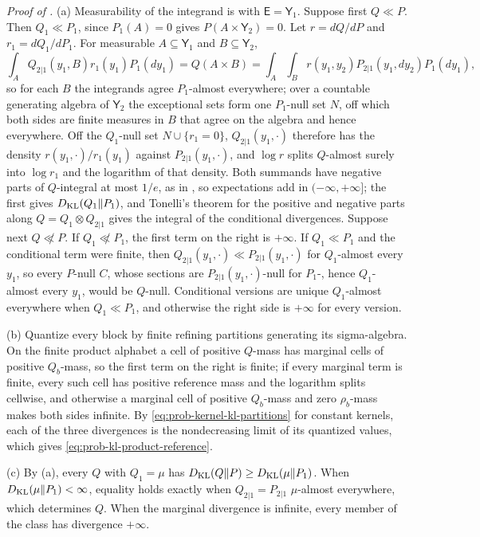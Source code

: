 \noindent\emph{Proof of .}
(a) Measurability of the integrand is  with $\mathsf E=\mathsf Y_1$.
Suppose first $Q\ll P$. Then $Q_1\ll P_1$, since $P_1(A)=0$ gives $P(A\times\mathsf Y_2)=0$. Let $r=dQ/dP$ and
$r_1=dQ_1/dP_1$. For measurable $A\subseteq\mathsf Y_1$ and $B\subseteq\mathsf Y_2$,
\[
\int_AQ_{2|1}(y_1,B)r_1(y_1)P_1(dy_1)=Q(A\times B)=\int_A\int_Br(y_1,y_2)P_{2|1}(y_1,dy_2)P_1(dy_1),
\]
so for each $B$ the integrands agree $P_1$-almost everywhere; over a countable generating algebra of
$\mathsf Y_2$ the exceptional sets form one $P_1$-null set $N$, off which both sides are finite measures in $B$
that agree on the algebra and hence everywhere. Off the $Q_1$-null set $N\cup\{r_1=0\}$, $Q_{2|1}(y_1,\cdot)$
therefore has the density $r(y_1,\cdot)/r_1(y_1)$ against $P_{2|1}(y_1,\cdot)$, and $\log r$ splits $Q$-almost
surely into $\log r_1$ and the logarithm of that density. Both summands have negative parts of $Q$-integral at
most $1/e$, as in , so expectations add in $(-\infty,+\infty]$; the
first gives $D_{\mathrm{KL}}(Q_1\Vert P_1)$, and Tonelli's theorem for the positive and negative parts along
$Q=Q_1\otimes Q_{2|1}$ gives the integral of the conditional divergences. Suppose next $Q\not\ll P$. If
$Q_1\not\ll P_1$, the first term on the right is $+\infty$. If $Q_1\ll P_1$ and the conditional term were
finite, then $Q_{2|1}(y_1,\cdot)\ll P_{2|1}(y_1,\cdot)$ for $Q_1$-almost every $y_1$, so every $P$-null $C$, whose
sections are $P_{2|1}(y_1,\cdot)$-null for $P_1$-, hence $Q_1$-almost every $y_1$, would be $Q$-null. Conditional
versions are unique $Q_1$-almost everywhere when $Q_1\ll P_1$, and otherwise the right side is $+\infty$ for
every version.

(b) Quantize every block by finite refining partitions generating its sigma-algebra. On the finite product
alphabet a cell of positive $Q$-mass has marginal cells of positive $Q_b$-mass, so the first term on the right
is finite; if every marginal term is finite, every such cell has positive reference mass and the logarithm
splits cellwise, and otherwise a marginal cell of positive $Q_b$-mass and zero $\rho_b$-mass makes both sides
infinite. By \eqref{eq:prob-kernel-kl-partitions} for constant kernels, each of the three divergences is the
nondecreasing limit of its quantized values, which gives \eqref{eq:prob-kl-product-reference}.

(c) By (a), every $Q$ with $Q_1=\mu$ has $D_{\mathrm{KL}}(Q\Vert P)\geq D_{\mathrm{KL}}(\mu\Vert P_1)$. When
$D_{\mathrm{KL}}(\mu\Vert P_1)<\infty$, equality holds exactly when $Q_{2|1}=P_{2|1}$ $\mu$-almost everywhere,
which determines $Q$. When the marginal divergence is infinite, every member of the class has divergence $+\infty$.

